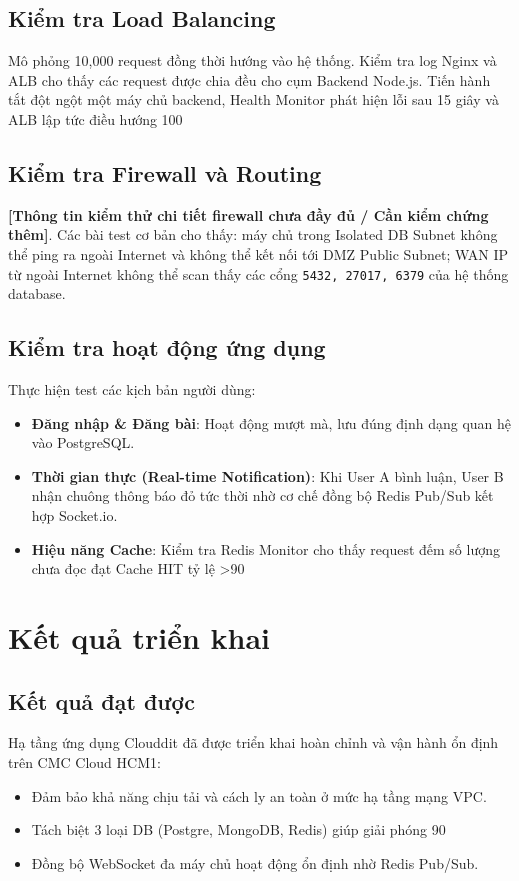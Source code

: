 \documentclass[12pt, a4paper]{article}
\begin{document}
\subsection{Kiểm tra Load Balancing}
Mô phỏng 10,000 request đồng thời hướng vào hệ thống. Kiểm tra log Nginx và ALB cho thấy các request được chia đều cho cụm Backend Node.js. Tiến hành tắt đột ngột một máy chủ backend, Health Monitor phát hiện lỗi sau 15 giây và ALB lập tức điều hướng 100%

\subsection{Kiểm tra Firewall và Routing}
\textbf{[Thông tin kiểm thử chi tiết firewall chưa đầy đủ / Cần kiểm chứng thêm]}. Các bài test cơ bản cho thấy: máy chủ trong Isolated DB Subnet không thể ping ra ngoài Internet và không thể kết nối tới DMZ Public Subnet; WAN IP từ ngoài Internet không thể scan thấy các cổng \texttt{5432, 27017, 6379} của hệ thống database.

\subsection{Kiểm tra hoạt động ứng dụng}
Thực hiện test các kịch bản người dùng:
\begin{itemize}
    \item \textbf{Đăng nhập & Đăng bài}: Hoạt động mượt mà, lưu đúng định dạng quan hệ vào PostgreSQL.
    \item \textbf{Thời gian thực (Real-time Notification)}: Khi User A bình luận, User B nhận chuông thông báo đỏ tức thời nhờ cơ chế đồng bộ Redis Pub/Sub kết hợp Socket.io.
    \item \textbf{Hiệu năng Cache}: Kiểm tra Redis Monitor cho thấy request đếm số lượng chưa đọc đạt Cache HIT tỷ lệ >90%
\end{itemize}



\section{Kết quả triển khai}

\subsection{Kết quả đạt được}
Hạ tầng ứng dụng Clouddit đã được triển khai hoàn chỉnh và vận hành ổn định trên CMC Cloud HCM1:
\begin{itemize}
    \item Đảm bảo khả năng chịu tải và cách ly an toàn ở mức hạ tầng mạng VPC.
    \item Tách biệt 3 loại DB (Postgre, MongoDB, Redis) giúp giải phóng 90%
    \item Đồng bộ WebSocket đa máy chủ hoạt động ổn định nhờ Redis Pub/Sub.
\end{itemize}
\end{document}
